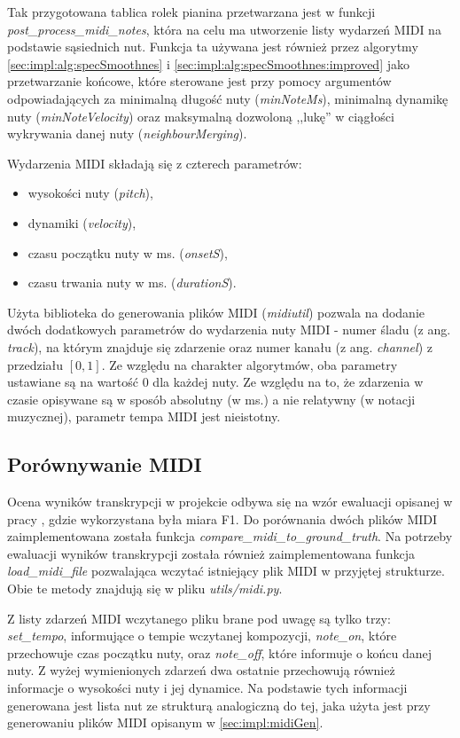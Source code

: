 \documentclass[12pt,a4paper,twoside]{mwart}
\begin{document}
Tak przygotowana tablica rolek pianina przetwarzana jest w funkcji \textit{post\_process\_midi\_notes}, która na celu ma utworzenie listy wydarzeń MIDI na podstawie sąsiednich nut. Funkcja ta używana jest również przez algorytmy \ref{sec:impl:alg:specSmoothnes} i \ref{sec:impl:alg:specSmoothnes:improved} jako przetwarzanie końcowe, które sterowane jest przy pomocy argumentów odpowiadających za minimalną długość nuty (\textit{minNoteMs}), minimalną dynamikę nuty (\textit{minNoteVelocity}) oraz maksymalną dozwoloną ,,lukę'' w ciągłości wykrywania danej nuty (\textit{neighbourMerging}).

Wydarzenia MIDI składają się z czterech parametrów:
\begin{itemize}
  \item wysokości nuty (\textit{pitch}),
  \item dynamiki (\textit{velocity}),
  \item czasu początku nuty w ms. (\textit{onsetS}),
  \item czasu trwania nuty w ms. (\textit{durationS}).
\end{itemize}
Użyta biblioteka do generowania plików MIDI (\textit{midiutil}) pozwala na dodanie dwóch dodatkowych parametrów do wydarzenia nuty MIDI - numer śladu (z ang. \textit{track}), na którym znajduje się zdarzenie oraz numer kanału (z ang. \textit{channel}) z przedziału $\left[0, 1\right]$. Ze względu na charakter algorytmów, oba parametry ustawiane są na wartość $0$ dla każdej nuty. Ze względu na to, że zdarzenia w czasie opisywane są w sposób absolutny (w ms.) a nie relatywny (w notacji muzycznej), parametr tempa MIDI jest nieistotny.

\subsection{Porównywanie MIDI}\label{sec:impl:midiCompare}
Ocena wyników transkrypcji w projekcie odbywa się na wzór ewaluacji opisanej w pracy \cite[3]{Transcription:Pertus:Inharmonicity}, gdzie wykorzystana była miara F1. Do porównania dwóch plików MIDI zaimplementowana została funkcja \textit{compare\_midi\_to\_ground\_truth}. Na potrzeby ewaluacji wyników transkrypcji została również zaimplementowana funkcja \textit{load\_midi\_file} pozwalająca wczytać istniejący plik MIDI w przyjętej strukturze. Obie te metody znajdują się w pliku \textit{utils/midi.py}.

Z listy zdarzeń MIDI wczytanego pliku brane pod uwagę są tylko trzy: \textit{set\_tempo}, informujące o tempie wczytanej kompozycji, \textit{note\_on}, które przechowuje czas początku nuty, oraz \textit{note\_off}, które informuje o końcu danej nuty. Z wyżej wymienionych zdarzeń dwa ostatnie przechowują również informacje o wysokości nuty i jej dynamice. Na podstawie tych informacji generowana jest lista nut ze strukturą analogiczną do tej, jaka użyta jest przy generowaniu plików MIDI opisanym w \ref{sec:impl:midiGen}.
\end{document}
